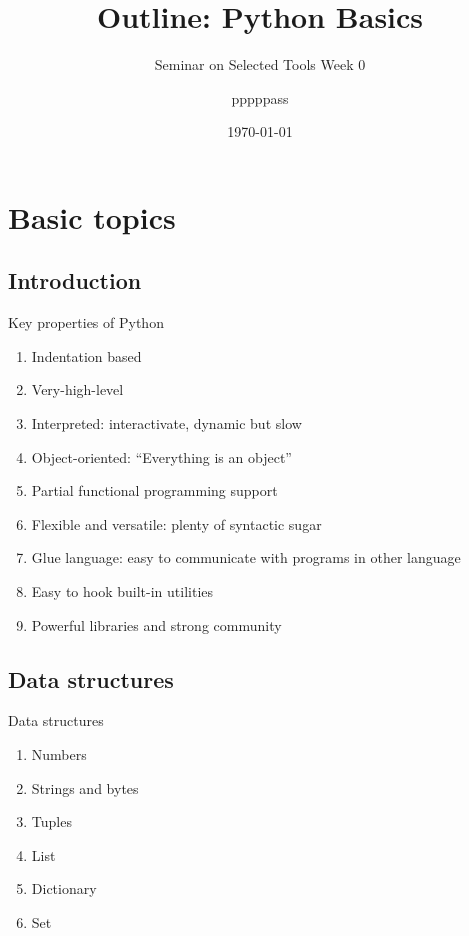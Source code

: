 \documentclass[english, nochinese]{pkuslide}
\title{Outline: Python Basics}
\subtitle{Seminar on Selected Tools Week 0}
\author{pppppass}
\date{\today}
\begin{document}
\begin{frame}
\titlepage
\end{frame}

\begin{frame}
\tableofcontents[subsectionstyle=show]
\end{frame}

\section{Basic topics}

\begin{frame}
\sectionpage
\end{frame}

\subsection{Introduction}

\begin{frame}{Key properties of Python}
\begin{enumerate}
\item Indentation based
\item Very-high-level
\item Interpreted: interactivate, dynamic but slow
\item Object-oriented: ``Everything is an object''
\item Partial functional programming support
\item Flexible and versatile: plenty of syntactic sugar
\item Glue language: easy to communicate with programs in other language
\item Easy to hook built-in utilities
\item Powerful libraries and strong community
\end{enumerate}
\end{frame}

\subsection{Data structures}

\begin{frame}{Data structures}
\begin{enumerate}
\item Numbers
\item Strings and bytes
\item Tuples
\item List
\item Dictionary
\item Set
\end{enumerate}
\end{frame}
\end{document}
